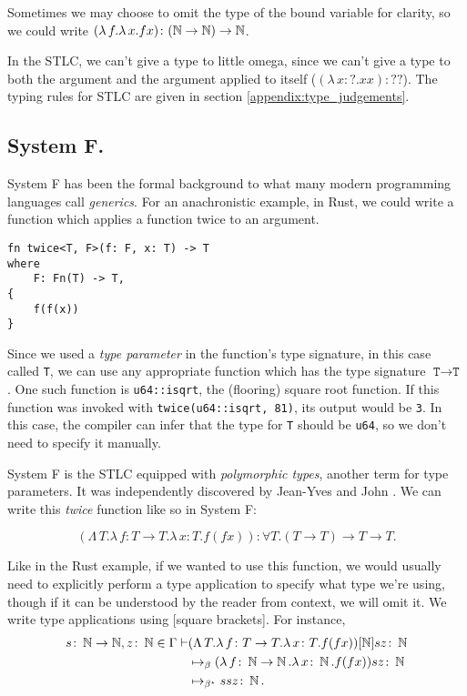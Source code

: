 Sometimes we may choose to omit the type of the bound variable for clarity, so we could write
$(\lambda \, f. \lambda \, x. fx) \colon (\operatorname{\mathbb{N}} \to \operatorname{\mathbb{N}}) \to \operatorname{\mathbb{N}}$.

In the STLC, we can't give a type to little omega, since we can't give a type to both the argument
and the argument applied to itself ($(\lambda \, x  \colon ? . x x) \colon ??$). The typing rules for
STLC are given in section \ref{appendix:type_judgements}.

\subsection{System F.}
System F has been the formal background to what many modern programming
languages call \textit{generics}. For an anachronistic example, in Rust, we could write a function
which applies a function twice to an argument.

\begin{verbatim}
fn twice<T, F>(f: F, x: T) -> T
where
    F: Fn(T) -> T,
{
    f(f(x))
}
\end{verbatim}

Since we used a \textit{type parameter} in the function's type signature, in this case called
\texttt{T}, we can use any appropriate function which has the type signature $\texttt{T} \to
\texttt{T}$. One such function is \texttt{u64::isqrt}, the (flooring) square root function. If this
function was invoked with \texttt{twice(u64::isqrt, 81)}, its output would be \texttt{3}. In this
case, the compiler can infer that the type for \texttt{T} should be \texttt{u64}, so
we don't need to specify it manually.

System F is the STLC equipped with \textit{polymorphic types}, another term for type parameters. It
was independently discovered by Jean-Yves \citet{girard_interpretation_1972} and John
\citet{goos_towards_1974}. We can write this \textit{twice} function like so in System F:

\begin{equation*}
  (\Lambda \, T. \lambda \, f \colon T \to T . \lambda \, x \colon T . f (f x))
  \colon \forall T . (T \to T) \to T \to T.
\end{equation*}

Like in the Rust example, if we wanted to use this function, we would usually need to explicitly
perform a type application to specify what type we're using, though if it can be understood by the
reader from context, we will omit it. We write type applications using [square brackets]. For
instance,
\begin{align*}
  s \colon \operatorname{\mathbb{N}} \to \operatorname{\mathbb{N}}, z \colon \operatorname{\mathbb{N}} \in \Gamma \vdash
  &(\Lambda \, T. \lambda \, f \colon T \to T . \lambda \, x \colon T . f (f x))[\operatorname{\mathbb{N}}] s z \colon \operatorname{\mathbb{N}}\\
  &\mapsto_{\beta} (\lambda \, f \colon \operatorname{\mathbb{N}} \to \operatorname{\mathbb{N}} . \lambda \, x \colon \operatorname{\mathbb{N}} . f (f x)) s z \colon \operatorname{\mathbb{N}}\\
  &\mapsto_{\beta^{\star}} s s z \colon \operatorname{\mathbb{N}}.
\end{align*}
